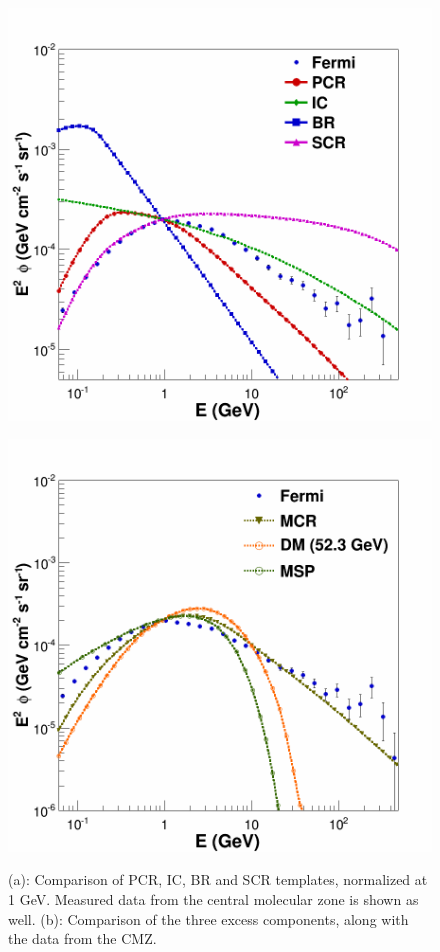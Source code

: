 \begin{figure}[h]
  \centering
  \begin{minipage}[h]{0.45\textwidth}
  	\centering
	\includegraphics[width=1\linewidth]{pic/method/norm_bkg_comp.png}
 	\label{fig:norm_bkg_component}
  \end{minipage}
  \hfill
  \begin{minipage}[h]{0.45\textwidth}
	  \centering
	  \includegraphics[width=1\linewidth]{pic/method/norm_excess_comp.png}
 	  \subcaption{}
 	  \label{fig:norm_excess_component}
  \end{minipage}
  \caption{(a):  Comparison of PCR, IC, BR and SCR templates, normalized at 1 GeV. Measured data from the central molecular zone is shown as well. (b): Comparison of the three excess components, along with the data from the CMZ.}
  \label{fig:norm_spectra} 
\end{figure}




